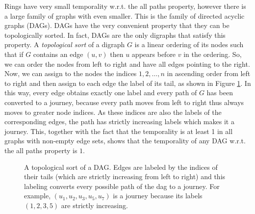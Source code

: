 \documentclass[oribibl, 11pt]{llncs}
\begin{document}
Rings have very small temporality w.r.t. the all paths property, however there is a large family of graphs with even smaller. This is the family of directed acyclic graphs (DAGs). DAGs have the very convenient property that they can be topologically sorted. In fact, DAGs are the only digraphs that satisfy this property. A \emph{topological sort} of a digraph $G$ is a linear ordering of its nodes such that if $G$ contains an edge $(u,v)$ then $u$ appears before $v$ in the ordering. So, we can order the nodes from left to right and have all edges pointing to the right.  Now, we can assign to the nodes the indices $1,2,\ldots,n$ in ascending order from left to right and then assign to each edge the label of its tail, as shown in Figure \ref{fig:dag}. In this way, every edge obtains exactly one label and every path of $G$ has been converted to a journey, because every path moves from left to right thus always moves to greater node indices. As these indices are also the labels of the corresponding edges, the path has strictly increasing labels which makes it a journey. This, together with the fact that the temporality is at least 1 in all graphs with non-empty edge sets, shows that the temporality of any DAG w.r.t. the all paths property is $1$.

\begin{figure}[!hbtp]
   \caption{A topological sort of a DAG. Edges are labeled by the indices of their tails (which are strictly increasing from left to right) and this labeling converts every possible path of the dag to a journey. For example, $(u_1,u_2,u_3,u_5,u_7)$ is a journey because its labels $(1,2,3,5)$ are strictly increasing.} \label{fig:dag}
\end{figure}
\end{document}
